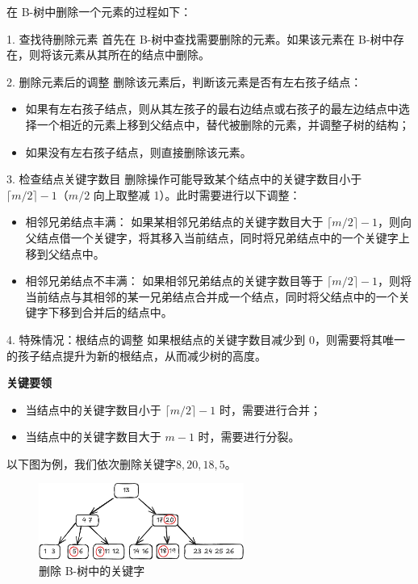 \documentclass[lang=cn,newtx,10pt,scheme=chinese]{../elegantbook}
\begin{document}
在 B-树中删除一个元素的过程如下：

1. 查找待删除元素  
   首先在 B-树中查找需要删除的元素。如果该元素在 B-树中存在，则将该元素从其所在的结点中删除。

2. 删除元素后的调整  
   删除该元素后，判断该元素是否有左右孩子结点：
   \begin{itemize}
     \item 如果有左右孩子结点，则从其左孩子的最右边结点或右孩子的最左边结点中选择一个相近的元素上移到父结点中，替代被删除的元素，并调整子树的结构；
     \item 如果没有左右孩子结点，则直接删除该元素。
   \end{itemize}

3. 检查结点关键字数目  
   删除操作可能导致某个结点中的关键字数目小于 $\lceil m/2 \rceil - 1$（$m/2$ 向上取整减 1）。此时需要进行以下调整：
   \begin{itemize}
     \item 相邻兄弟结点丰满：  
       如果某相邻兄弟结点的关键字数目大于 $\lceil m/2 \rceil - 1$，则向父结点借一个关键字，将其移入当前结点，同时将兄弟结点中的一个关键字上移到父结点中。
     \item 相邻兄弟结点不丰满：  
       如果相邻兄弟结点的关键字数目等于 $\lceil m/2 \rceil - 1$，则将当前结点与其相邻的某一兄弟结点合并成一个结点，同时将父结点中的一个关键字下移到合并后的结点中。
   \end{itemize}

4. 特殊情况：根结点的调整  
   如果根结点的关键字数目减少到 0，则需要将其唯一的孩子结点提升为新的根结点，从而减少树的高度。


\textbf{关键要领}  

\begin{itemize}
  \item 当结点中的关键字数目小于 $\lceil m/2 \rceil - 1$ 时，需要进行合并；
  \item 当结点中的关键字数目大于 $m-1$ 时，需要进行分裂。
\end{itemize}

以下图为例，我们依次删除关键字$8,20,18,5$。

\begin{figure}[!htbp]
  \centering
  \includegraphics[width=0.6\textwidth]{./figure/pdf/cropped/Btree_del1.pdf}
  \caption{删除 B-树中的关键字}
  \label{fig:Btree_delete}

  \end{figure}
\end{document}
